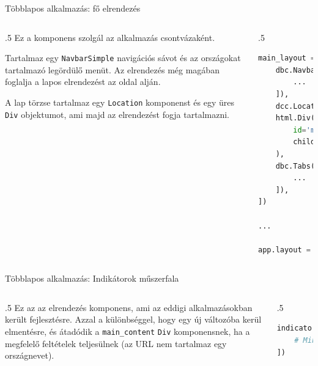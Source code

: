 \documentclass[english, aspectratio=169]{beamer}
\begin{document}
\begin{frame}[fragile]{Többlapos alkalmazás: fő elrendezés}
	\begin{columns}
		\begin{column}{.5\textwidth}
			Ez a komponens szolgál az alkalmazás csontvázaként.\par\medskip
			Tartalmaz egy \texttt{NavbarSimple} navigációs sávot és az országokat tartalmazó legördülő menüt. Az elrendezés még magában foglalja a lapos elrendezést az oldal alján.\par\medskip
			A lap törzse tartalmaz egy \texttt{Location} komponenst és egy üres \texttt{Div} objektumot, ami majd az elrendezést fogja tartalmazni.
		\end{column}
		\begin{column}{.5\textwidth}
			\begin{lstlisting}[language=python]
main_layout = html.Div([
	dbc.NavbarSimple([
		...
	]),
	dcc.Location(id='location'),
	html.Div(
		id='main_content',
		children=[...],
	),
	dbc.Tabs([
		...
	]),
])

...

app.layout = main_layout
			\end{lstlisting}
		\end{column}
	\end{columns}
\end{frame}

\begin{frame}[fragile]{Többlapos alkalmazás: Indikátorok műszerfala}
	\begin{columns}
		\begin{column}{.5\textwidth}
			Ez az az elrendezés komponens, ami az eddigi alkalmazásokban került fejlesztésre. Azzal a különbséggel, hogy egy új változóba kerül elmentésre, és átadódik a \texttt{main\_content} \texttt{Div} komponensnek, ha a megfelelő feltételek teljesülnek (az URL nem tartalmaz egy országnevet).
		\end{column}
		\begin{column}{.5\textwidth}
			\begin{lstlisting}[language=python]
indicators_dashboard = html.Div([
	# Minden eddigi komponens
])
			\end{lstlisting}
		\end{column}
	\end{columns}
\end{frame}
\end{document}
